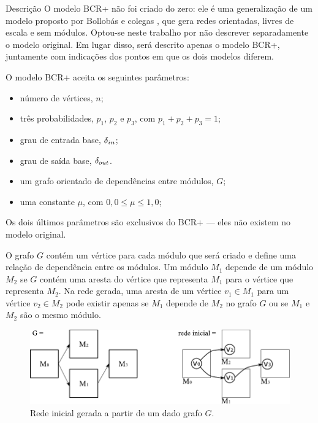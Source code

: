 \begin{section}{Descrição}
	O modelo BCR+ não foi criado do zero: ele é uma generalização de um modelo proposto por Bollobás e colegas \cite{Bollobas2003}, que gera redes orientadas, livres de escala e sem módulos. Optou-se neste trabalho por não descrever separadamente o modelo original. Em lugar disso, será descrito apenas o modelo BCR+, juntamente com indicações dos pontos em que os dois modelos diferem.
		
	O modelo BCR+ aceita os seguintes parâmetros:

	\begin{itemize}
	\item número de vértices, $n$;
	\item três probabilidades, $p_1$, $p_2$ e $p_3$, com $p_1 + p_2 + p_3 = 1$;
	\item grau de entrada base, $\delta_{in}$;
	\item grau de saída base, $\delta_{out}$.
	\item um grafo orientado de dependências entre módulos, $G$;
	\item uma constante $\mu$, com $0,0 \le \mu \le 1,0$;
	\end{itemize}
	
	Os dois últimos parâmetros são exclusivos do BCR+ --- eles não existem no modelo original.

	O grafo $G$ contém um vértice para cada módulo que será criado e define uma relação de dependência entre os módulos. Um módulo $M_1$ depende de um módulo $M_2$ se $G$ contém uma aresta do vértice que representa $M_1$ para o vértice que representa $M_2$. Na rede gerada, uma aresta de um vértice $v_1 \in M_1$ para um vértice $v_2 \in M_2$ pode existir apenas se $M_1$ depende de $M_2$ no grafo $G$ ou se $M_1$ e $M_2$ são o mesmo módulo. %

	\begin{figure}[htbp]
		\centering
			\includegraphics[scale=1]{figuras/exemplo-bcr-g}
		\caption{Rede inicial gerada a partir de um dado grafo $G$.}
		\label{fig:bcr-g}
	\end{figure}


\end{section}
